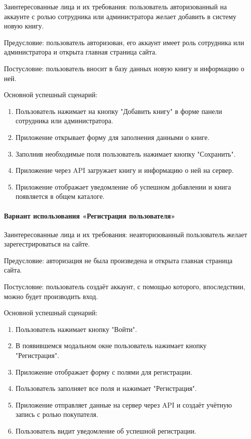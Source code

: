 Заинтересованные лица и их требования: пользователь авторизованный на аккаунте с ролью сотрудника или администратора желает добавить в систему новую книгу.

Предусловие: пользователь авторизован, его аккаунт имеет роль сотрудника или администратора и открыта главная страница сайта.

Постусловие: пользователь вносит в базу данных новую книгу и информацию о ней.

Основной успешный сценарий:

\begin{enumerate}
	\item Пользователь нажимает на кнопку "Добавить книгу" в форме панели сотрудника или администратора.
	\item Приложение открывает форму для заполнения данными о книге.
	\item Заполнив необходимые поля пользователь нажимает кнопку "Сохранить".
	\item Приложение через API загружает книгу и информацию о ней на сервер.
	\item Приложение отображает уведомление об успешном добавлении и книга появляется в общем каталоге.
\end{enumerate}

\paragraph{Вариант использования «Регистрация пользователя»}

Заинтересованные лица и их требования: неавторизованный пользователь желает зарегестрироваться на сайте.

Предусловие: авторизация не была произведена и открыта главная страница сайта.

Постусловие: пользователь создаёт аккаунт, с помощью которого, впоследствии, можно будет производить вход. 

Основной успешный сценарий:

\begin{enumerate}
	\item Пользователь нажимает кнопку "Войти".
	\item В появившемся модальном окне пользователь нажимает кнопку "Регистрация".
	\item Приложение отображает форму с полями для регистрации.
	\item Пользователь заполняет все поля и нажимает "Регистрация".
	\item Приложение отправляет данные на сервер через API и создаёт учётную запись с ролью покупателя.
	\item Пользователь видит уведомление об успешной регистрации.
\end{enumerate}

